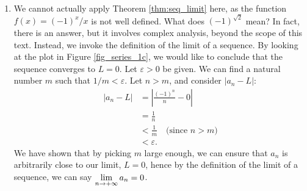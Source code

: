 \begin{example}
\begin{enumerate}
\item		We cannot actually apply Theorem \ref{thm:seq_limit} here, as the function $f(x) = (-1)^x/x$ is not well defined. What does $(-1)^{\sqrt{2}}$ mean? In fact, there is an answer, but it involves complex analysis, beyond the scope of this text. Instead, we invoke the definition of the limit of a sequence. By looking at the plot in Figure \ref{fig_series_1c}, we would like to conclude that the sequence converges to $L=0$. Let $\varepsilon>0$ be given. We can find a natural number $m$ such that $1/m < \varepsilon$. Let $n>m$, and consider $|a_n - L|$:
\begin{align*}
|a_n - L| &= \left|\frac{(-1)^n}{n} - 0\right| \\[0.2cm]
					&= \frac1n\\[0.2cm]
					&< \frac1m\quad \text{(since $n>m$)}\\[0.2cm]
					&< \varepsilon.
\end{align*}
\enlargethispage{2\baselineskip}
We have shown that by picking $m$ large enough, we can ensure that $a_n$ is arbitrarily close to our limit, $L=0$, hence by the definition of the limit of a sequence, we can say $\displaystyle \lim_{n\to+\infty}a_n = 0$.
\end{enumerate}


\end{example}

